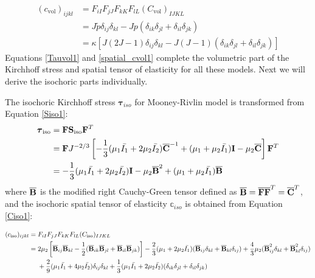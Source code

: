 \begin{appendices}
\begin{subequations} \label{spatial_cvol1}
\begin{align}
(c_\mathrm{vol})_{ijkl} &= F_{iI}F_{jJ}F_{kK}F_{lL}(C_\mathrm{vol})_{IJKL} \\
&= J\tilde{p}\delta_{ij}\delta_{kl} - Jp(\delta_{ik}\delta_{jl} + \delta_{il}\delta_{jk}) \label{spatial_cvol11} \\
&= \kappa[J(2J-1)\delta_{ij}\delta_{kl} - J(J-1)(\delta_{ik}\delta_{jl} + \delta_{il}\delta_{jk})] \label{spatial_cvol12}
\end{align}
\end{subequations} 
Equations \ref{Tauvol1} and \ref{spatial_cvol1} complete the volumetric part of the Kirchhoff stress and spatial tensor of elasticity for all these models. Next we will derive the isochoric parts individually.

The isochoric Kirchhoff stress $\boldsymbol{\tau}_{iso}$ for Mooney-Rivlin model is transformed from Equation \ref{Siso1}:
\begin{equation} \label{Tauiso1}
\begin{split}
\boldsymbol{\tau}_\mathrm{iso} &= \bold{F}\bold{S}_\mathrm{iso}{\bold{F}}^T \\
	   			    &= \bold{F}  J^{-2/3} \left[    - \frac{1}{3}(\mu_1\bar{I_1} + 2\mu_2\bar{I_2}) \overline{\bold{C}}^{-1}  + (\mu_1 + \mu_2\bar{I_1})\bold{I} - \mu_2\overline{\bold{C}} \right]   \bold{F}^T 
\\
				    &= - \frac{1}{3}(\mu_1\bar{I_1} + 2\mu_2\bar{I_2})\bold{I} - \mu_2{\overline{\bold{B}}}^2 + (\mu_1 + \mu_2\bar{I_1}){\overline{\bold{B}}}
\end{split}
\end{equation}
where $\overline{\bold{B}}$ is the modified right Cauchy-Green tensor defined as $\overline{\bold{B}} = \overline{\bold{F}}\overline{\bold{F}}^T = \overline{\bold{C}}^T$, and the isochoric spatial tensor of elasticity $\mathbb{c}_{iso}$ is obtained from Equation \ref{Ciso1}:

\begin{equation} \label{spatial_ciso1}
\begin{split}
(c_\mathrm{iso})_{ijkl} = {}&  F_{iI}F_{jJ}F_{kK}F_{lL}(C_\mathrm{iso})_{IJKL} \\
= {} &
2\mu_2 \left[{\overline{\bold{B}}}_{ij} {\overline{\bold{B}}}_{kl} - \frac{1}{2}({\overline{\bold{B}}}_{ik}{\overline{\bold{B}}}_{jl} + {\overline{\bold{B}}}_{il}{\overline{\bold{B}}}_{jk}) \right] 
- \frac{2}{3}(\mu_1 + 2\mu_2\bar{I_1})({\overline{\bold{B}}}_{ij}\delta_{kl} + {\overline{\bold{B}}}_{kl}\delta_{ij}) 
+ \frac{4}{3}\mu_2({\overline{\bold{B}}}^2_{ij}\delta_{kl} + {\overline{\bold{B}}}^2_{kl}\delta_{ij}) \\
&+
\frac{2}{9}(\mu_1\bar{I_1} + 4\mu_2\bar{I_2}) \delta_{ij}\delta_{kl}
+ \frac{1}{3}(\mu_1\bar{I_1} + 2\mu_2\bar{I_2})(\delta_{ik}\delta_{jl} + \delta_{il}\delta_{jk})
\end{split}
\end{equation} 


\end{appendices}
